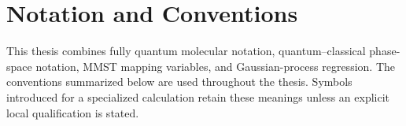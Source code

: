 \documentclass[
  11pt,
  letterpaper,
  onehalfspacing,
  normalmargins,
  equalmargins,
  oneside
]{ut-thesis}
\begin{document}

\chapter*{Notation and Conventions}
{}
\label{sec:global-notation-conventions}

This thesis combines fully quantum molecular notation, quantum--classical
phase-space notation, MMST mapping variables, and Gaussian-process regression.
The conventions summarized below are used throughout the thesis. Symbols
introduced for a specialized calculation retain these meanings unless an
explicit local qualification is stated.

\begingroup
\small
\renewcommand{\arraystretch}{1.18}
\setlength{\tabcolsep}{4pt}
\end{document}
